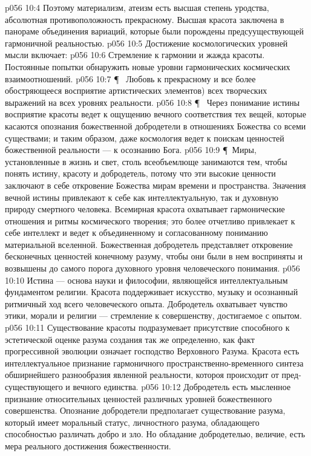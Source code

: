 \vs p056 10:4 Поэтому материализм, атеизм есть высшая степень уродства, абсолютная противоположность прекрасному. Высшая красота заключена в панораме объединения вариаций, которые были порождены предсууществующей гармоничной реальностью.
\vs p056 10:5 Достижение космологических уровней мысли включает:
\vs p056 10:6 \bibnobreakspace {} Стремление к гармонии и жажда красоты. Постоянные попытки обнаружить новые уровни гармонических космических взаимоотношений.
\vs p056 10:7 \P\ \bibnobreakspace {} Любовь к прекрасному и все более обостряющееся восприятие артистических элементов) всех творческих выражений на всех уровнях реальности.
\vs p056 10:8 \P\ \bibnobreakspace {} Через понимание истины восприятие красоты ведет к ощущению вечного соответствия тех вещей, которые касаются опознания божественной добродетели в отношениях Божества со всеми существами; и таким образом, даже космология ведет к поискам ценностей божественной реальности --- к осознанию Бога.
\vs p056 10:9 \P\ Миры, установленные в жизнь и свет, столь всеобъемлюще занимаются тем, чтобы понять истину, красоту и добродетель, потому что эти высокие ценности заключают в себе откровение Божества мирам времени и пространства. Значения вечной истины привлекают к себе как интеллектуальную, так и духовную природу смертного человека. Всемирная красота охватывает гармонические отношения и ритмы космического творения; это более отчетливо привлекает к себе интеллект и ведет к объединенному и согласованному пониманию материальной вселенной. Божественная добродетель представляет откровение бесконечных ценностей конечному разуму, чтобы они были в нем восприняты и возвышены до самого порога духовного уровня человеческого понимания.
\vs p056 10:10 Истина --- основа науки и философии, являющейся интеллектуальным фундаментом религии. Красота поддерживает искусство, музыку и осознанный ритмичный ход всего человеческого опыта. Добродетель охватывает чувство этики, морали и религии --- стремление к совершенству, достигаемое с опытом.
\vs p056 10:11 Существование красоты подразумевает присутствие способного к эстетической оценке разума создания так же определенно, как факт прогрессивной эволюции означает господство Верховного Разума. Красота есть интеллектуальное признание гармоничного пространственно\hyp{}временного синтеза обширнейшего разнообразия явленной реальности, котороя происходит от пред\hyp{}существующего и вечного единства.
\vs p056 10:12 Добродетель есть мысленное признание относительных ценностей различных уровней божественного совершенства. Опознание добродетели предполагает существование разума, который имеет моральный статус, личностного разума, обладающего способностью различать добро и зло. Но обладание добродетелью, величие, есть мера реального достижения божественности.
